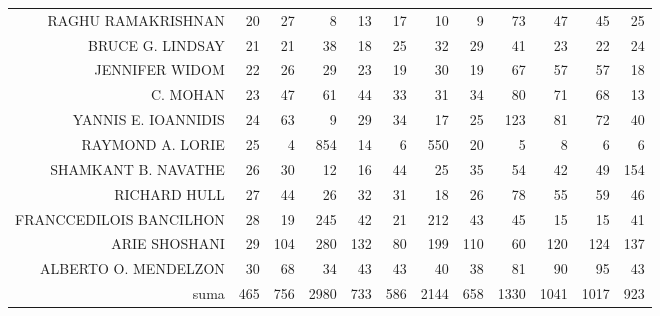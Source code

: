 \documentclass{bakalarka}
\begin{document}
\begin{table}[!ht]
\begin{sideways}
\begin{scriptsize}
\begin{tabular}{r|r|rrrrrrrrrr}
RAGHU RAMAKRISHNAN&20&27&8&13&17&10&9&73&47&45&25\\
BRUCE G. LINDSAY&21&21&38&18&25&32&29&41&23&22&24\\
JENNIFER WIDOM&22&26&29&23&19&30&19&67&57&57&18\\
C. MOHAN&23&47&61&44&33&31&34&80&71&68&13\\
YANNIS E. IOANNIDIS&24&63&9&29&34&17&25&123&81&72&40\\
RAYMOND A. LORIE&25&4&854&14&6&550&20&5&8&6&6\\
SHAMKANT B. NAVATHE&26&30&12&16&44&25&35&54&42&49&154\\
RICHARD HULL&27&44&26&32&31&18&26&78&55&59&46\\
FRANCCEDILOIS BANCILHON&28&19&245&42&21&212&43&45&15&15&41\\
ARIE SHOSHANI&29&104&280&132&80&199&110&60&120&124&137\\
ALBERTO O. MENDELZON&30&68&34&43&43&40&38&81&90&95&43\\
\midrule
suma&465&756&2980&733&586&2144&658&1330&1041&1017&923\\
\bottomrule
\end{tabular}
\end{scriptsize}
\end{sideways}
\end{table}
\end{document}
